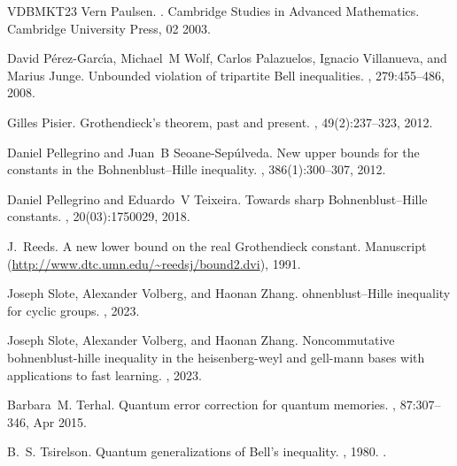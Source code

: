 \documentclass[11pt]{article}
\theoremstyle{plain}
\theoremstyle{plain}
\theoremstyle{definition}
\theoremstyle{remark}
\theoremstyle{named}
\begin{document}
\begin{thebibliography}{VDBMKT23}
Vern Paulsen.
.
\newblock Cambridge Studies in Advanced Mathematics. Cambridge University
  Press, 02 2003.

David P{\'e}rez-Garc{\'\i}a, Michael~M Wolf, Carlos Palazuelos, Ignacio
  Villanueva, and Marius Junge.
\newblock Unbounded violation of tripartite {B}ell inequalities.
, 279:455--486, 2008.

Gilles Pisier.
\newblock Grothendieck's theorem, past and present.
, 49(2):237--323,
  2012.

Daniel Pellegrino and Juan~B Seoane-Sep{\'u}lveda.
\newblock New upper bounds for the constants in the {B}ohnenblust--{H}ille
  inequality.
,
  386(1):300--307, 2012.

Daniel Pellegrino and Eduardo~V Teixeira.
\newblock Towards sharp {B}ohnenblust--{H}ille constants.
, 20(03):1750029,
  2018.

J.~Reeds.
\newblock A new lower bound on the real {Grothendieck} constant.
\newblock Manuscript (\url{http://www.dtc.umn.edu/~reedsj/bound2.dvi}), 1991.

Joseph Slote, Alexander Volberg, and Haonan Zhang.
ohnenblust--{H}ille inequality for cyclic groups.
, 2023.

Joseph Slote, Alexander Volberg, and Haonan Zhang.
\newblock Noncommutative bohnenblust-hille inequality in the heisenberg-weyl
  and gell-mann bases with applications to fast learning.
, 2023.

Barbara~M. Terhal.
\newblock Quantum error correction for quantum memories.
, 87:307--346, Apr 2015.

B.~S. Tsirelson.
\newblock Quantum generalizations of {B}ell's inequality.
, 1980.
\newblock \href {https://doi.org/10.1007/BF00417500}
  {}.


\end{thebibliography}
\end{document}
